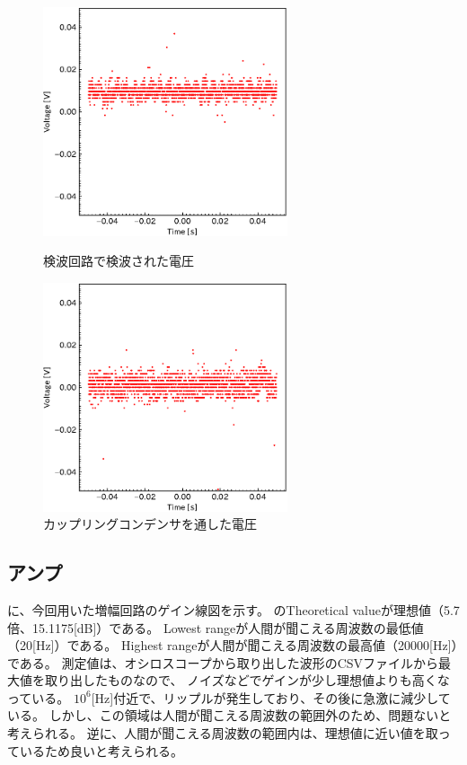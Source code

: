 \documentclass[report.tex]{subfiles}
\begin{document}
\begin{figure}[H]
	\begin{minipage}[b]{0.5\linewidth}
		\centering
		\includegraphics[width=7.2cm]{fig/koil_diode.pdf}
		\caption{検波回路で検波された電圧}
		\label{fig:koil_diode}
	\end{minipage}
	\begin{minipage}[b]{0.5\linewidth}
		\centering
		\includegraphics[width=7.2cm]{fig/koil_diode_bi.pdf}
		\caption{カップリングコンデンサを通した電圧}
		\label{fig:koil_diode_bi}
	\end{minipage}
\end{figure}

\subsection{アンプ}

に、今回用いた増幅回路のゲイン線図を示す。
のTheoretical valueが理想値（5.7倍、15.1175[dB]）である。
Lowest rangeが人間が聞こえる周波数の最低値（20[Hz]）である。
Highest rangeが人間が聞こえる周波数の最高値（20000[Hz]）である。
測定値は、オシロスコープから取り出した波形のCSVファイルから最大値を取り出したものなので、
ノイズなどでゲインが少し理想値よりも高くなっている。
\(10^6\)[Hz]付近で、リップルが発生しており、その後に急激に減少している。
しかし、この領域は人間が聞こえる周波数の範囲外のため、問題ないと考えられる。
逆に、人間が聞こえる周波数の範囲内は、理想値に近い値を取っているため良いと考えられる。
\end{document}
